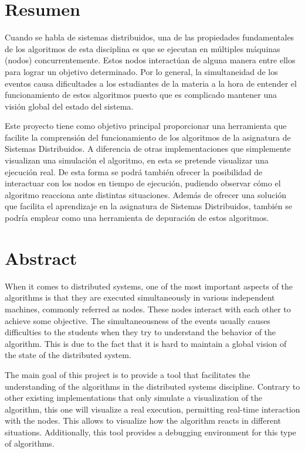 \chapter*{Resumen}

Cuando se habla de sistemas distribuidos, una de las propiedades fundamentales de los algoritmos de esta disciplina es que se ejecutan en múltiples máquinas (nodos) concurrentemente. Estos nodos interactúan de alguna manera entre ellos para lograr un objetivo determinado. Por lo general, la simultaneidad de los eventos causa dificultades a los estudiantes de la materia a la hora de entender el funcionamiento de estos algoritmos puesto que es complicado mantener una visión global del estado del sistema.

Este proyecto tiene como objetivo principal proporcionar una herramienta que facilite la comprensión del funcionamiento de los algoritmos de la asignatura de Sistemas Distribuidos. A diferencia de otras implementaciones que simplemente visualizan una simulación el algoritmo, en esta se pretende visualizar una ejecución real. De esta forma se podrá también ofrecer la posibilidad de interactuar con los nodos en tiempo de ejecución, pudiendo observar cómo el algoritmo reacciona ante distintas situaciones. Además de ofrecer una solución que facilita el aprendizaje en la asignatura de Sistemas Distribuidos, también se podría emplear como una herramienta de depuración de estos algoritmos.

\newpage

\chapter*{Abstract}

When it comes to distributed systems, one of the most important aspects of the algorithms is that they are executed simultaneously in various independent machines, commonly referred as nodes. These nodes interact with each other to achieve some objective. The simultaneousness of the events usually causes difficulties to the students when they try to understand the behavior of the algorithm. This is due to the fact that it is hard to maintain a global vision of the state of the distributed system.

The main goal of this project is to provide a tool that facilitates the understanding of the algorithms in the distributed systems discipline. Contrary to other existing implementations that only simulate a visualization of the algorithm, this one will visualize a real execution, permitting real-time interaction with the nodes. This allows to visualize how the algorithm reacts in different situations. Additionally, this tool provides a debugging environment for this type of algorithms.


